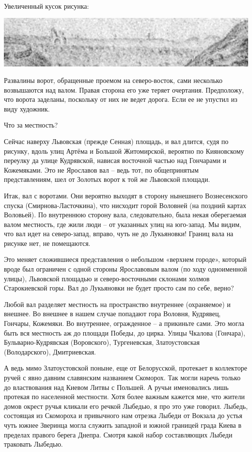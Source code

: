 Увеличенный кусок рисунка:

\begin{center}
\includegraphics[width=\linewidth]{chast-colebanie-osnov/gora-zamkovaya-valovaya/val-big.jpg}
\end{center}

Развалины ворот, обращенные проемом на северо-восток, сами несколько возвышаются над валом. Правая сторона его уже теряет очертания. Предположу, что ворота заделаны, поскольку от них не ведет дорога. Если ее не упустил из виду художник.

Что за местность?

Сейчас наверху Львовская (прежде Сенная) площадь, и вал длится, судя по рисунку, вдоль улиц Артёма и Большой Житомирской, вероятно по Кияновскому переулку да улице Кудрявской, нависая восточной частью над Гончарами и Кожемяками. Это не Ярославов вал – ведь тот, по общепринятым представлениям, шел от Золотых ворот к той же Львовской площади.

Итак, вал с воротами. Они вероятно выходят в сторону нынешнего Вознесенского спуска (Смирнова-Ласточ\-кина), что нисходит горой Воловней (на поздний картах Воловьей). По внутреннюю сторону вала, следовательно, была некая оберегаемая валом местность, где жили люди – от указанных улиц на юго-запад. Мы видим, что вал идет на северо-запад, вправо, чуть не до Лукьяновки! Границ вала на рисунке нет, не помещаются.

Это меняет сложившиеся представления о небольшом «верхнем городе», который вроде был ограничен с одной стороны Ярославовым валом (по ходу одноименной улицы), Львовской площадью и северо-восточными склонами холмов Старокиевской горы. Вал до Лукьяновки не будет просто сам по себе, верно?

Любой вал разделяет местность на пространство внутреннее (охраняемое) и внешнее. Во внешнее в нашем случае попадают гора Воловня, Кудрявец, Гончары, Кожемяки. Во внутреннее, огражденное – а прикиньте сами. Это могла быть вся местность аж до площади Победы, до цирка. Улицы Чкалова (Гончара), Бульварно-Кудрявская (Воровского), Тургеневская, Златоустовская (Володарского), Дмитриевская.

А ведь мимо Златоустовской поныне, еще от Белорусской, протекает в коллекторе ручей с явно давним славянским названием Скоморох. Так могли наречь только до властвования над Киевом Литвы с Польшей. А ручьи именовались лишь протекая по населенной местности. Хотя более важным кажется мне, что жители домов окрест ручья кликали его речкой Лыбедью, я про это уже говорил. Лыбедь, состоящая из Скомороха и привычного нам отрезка Лыбеди от Вокзала до устья чуть южнее Зверинца могла служить западной и южной границей града Киева в пределах правого берега Днепра. Смотря какой набор составляющих Лыбеди траковать Лыбедью.

